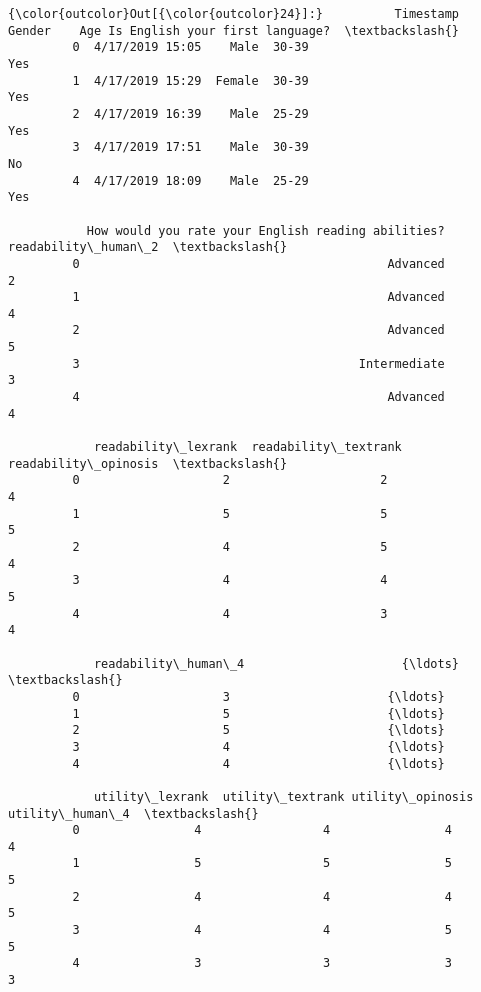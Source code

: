 \documentclass[11pt]{article}
\begin{document}
\begin{Verbatim}[commandchars=\\\{\}]
{\color{outcolor}Out[{\color{outcolor}24}]:}          Timestamp  Gender    Age Is English your first language?  \textbackslash{}
         0  4/17/2019 15:05    Male  30-39                             Yes   
         1  4/17/2019 15:29  Female  30-39                             Yes   
         2  4/17/2019 16:39    Male  25-29                             Yes   
         3  4/17/2019 17:51    Male  30-39                              No   
         4  4/17/2019 18:09    Male  25-29                             Yes   
         
           How would you rate your English reading abilities?  readability\_human\_2  \textbackslash{}
         0                                           Advanced                    2   
         1                                           Advanced                    4   
         2                                           Advanced                    5   
         3                                       Intermediate                    3   
         4                                           Advanced                    4   
         
            readability\_lexrank  readability\_textrank  readability\_opinosis  \textbackslash{}
         0                    2                     2                     4   
         1                    5                     5                     5   
         2                    4                     5                     4   
         3                    4                     4                     5   
         4                    4                     3                     4   
         
            readability\_human\_4                      {\ldots}                       \textbackslash{}
         0                    3                      {\ldots}                        
         1                    5                      {\ldots}                        
         2                    5                      {\ldots}                        
         3                    4                      {\ldots}                        
         4                    4                      {\ldots}                        
         
            utility\_lexrank  utility\_textrank utility\_opinosis utility\_human\_4  \textbackslash{}
         0                4                 4                4               4   
         1                5                 5                5               5   
         2                4                 4                4               5   
         3                4                 4                5               5   
         4                3                 3                3               3   
         

\end{Verbatim}
\end{document}
